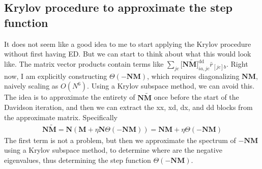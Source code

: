 
\subsection{Krylov procedure to approximate the step function}
It does not seem like a good idea to me to start applying the Krylov procedure without first having ED. But we can start to think about what this would look like. The matrix vector products contain terms like $\sum_{jc}\bigl[ \mathbf{N} \tilde{\mathbf{M}}\bigr]_{i a, j c}^{\mathrm{dd}} \bar{r}_{[j c] b}$. Right now, I am explicitly constructing $\Theta(-\bm{N}\bm{M})$, which requires diagonalizing $\bm{N}\bm{M}$, naively scaling as $O(N^6)$. Using a Krylov subspace method, we can avoid this. The idea is to approximate the entirety of $\mathbf{N} \tilde{\mathbf{M}}$ once before the start of the Davidson iteration, and then we can extract the xx, xd, dx, and dd blocks from the approximate matrix. Specifically
\begin{align}
\bm{N}\tilde{\bm{M}} = \bm{N}\left(\bm{M}+\eta \bm{N} \Theta(-\bm{N}\bm{M})\right) = \bm{N}\bm{M} + \eta \Theta(-\bm{N}\bm{M})
\end{align}
The first term is not a problem, but then we approximate the spectrum of $-\bm{N}\bm{M}$ using a Krylov subspace method, to determine where are the negative eigenvalues, thus determining the step function $\Theta(-\bm{N}\bm{M})$.
